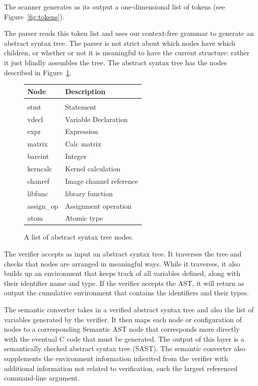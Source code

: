 The scanner generates as its output a one-dimensional list of tokens (see Figure~\ref{fig:tokens}).

The parser reads this token list and uses our context-free grammar to generate
an abstract syntax tree. The parser is not strict about which nodes have
which children, or whether or not it is meaningful to have the current
structure: rather it just blindly assembles the tree. The abstract syntax tree
has the nodes described in Figure~\ref{fig:astnodes}.

\vspace{10mm}
\begin{figure}
\begin{center}
\begin{tabular}{l | l}
{\bf Node} & {\bf Description} \\
\hline \\
stmt & Statement \\
vdecl & Variable Declaration \\
expr & Expression \\
matrix & Calc matrix \\
bareint & Integer \\
kerncalc & Kernel calculation \\
chanref & Image channel reference \\
libfunc & \sys{} library function \\
assign\_op & Assignment operation \\
atom & Atomic type
\end{tabular}
\caption{A list of abstract syntax tree nodes.}
\label{fig:astnodes}
\end{center}
\end{figure}

The verifier accepts as input an abstract syntax tree. It traverses the
tree and checks that nodes are arranged in meaningful ways. While it
traverses, it also builds up an environment that keeps track of all
variables defined, along with their identifier name and type. If the
verifier accepts the AST, it will return as output the cumulative
environment that contains the identifiers and their types.

The semantic converter takes in a verified abstract syntax tree and also the
list of variables generated by the verifier. It then maps each node or
configuration of nodes to a corresponding Semantic AST node that
corresponds more directly with the eventual C code that must be generated.
The output of this layer is a semantically checked abstract syntax tree
(SAST). The semantic converter also supplements the environment information
inherited from the verifier with additional information not related to
verification, such the largest referenced command-line argument.


